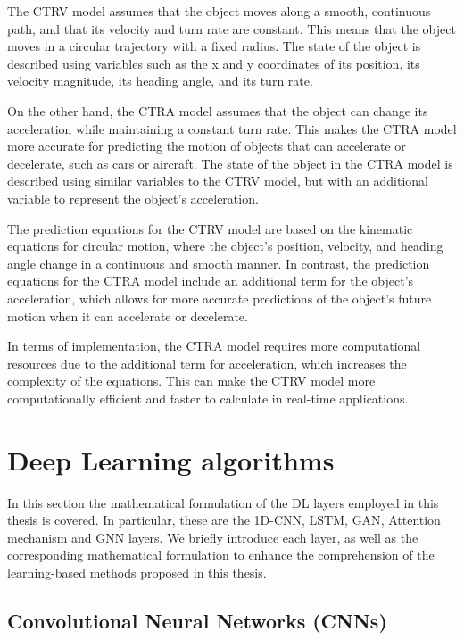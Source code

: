 The CTRV model assumes that the object moves along a smooth, continuous path, and that its velocity and turn rate are constant. This means that the object moves in a circular trajectory with a fixed radius. The state of the object is described using variables such as the x and y coordinates of its position, its velocity magnitude, its heading angle, and its turn rate.

On the other hand, the CTRA model assumes that the object can change its acceleration while maintaining a constant turn rate. This makes the CTRA model more accurate for predicting the motion of objects that can accelerate or decelerate, such as cars or aircraft. The state of the object in the CTRA model is described using similar variables to the CTRV model, but with an additional variable to represent the object's acceleration.

The prediction equations for the CTRV model are based on the kinematic equations for circular motion, where the object's position, velocity, and heading angle change in a continuous and smooth manner. In contrast, the prediction equations for the CTRA model include an additional term for the object's acceleration, which allows for more accurate predictions of the object's future motion when it can accelerate or decelerate.

In terms of implementation, the CTRA model requires more computational resources due to the additional term for acceleration, which increases the complexity of the equations. This can make the CTRV model more computationally efficient and faster to calculate in real-time applications. 

\section{Deep Learning algorithms}
\label{sec:3_dlb_formulation}

In this section the mathematical formulation of the \ac{DL} layers employed in this thesis is covered. In particular, these are the 1D-\ac{CNN}, \ac{LSTM}, \ac{GAN}, Attention mechanism and \ac{GNN} layers. We briefly introduce each layer, as well as the corresponding mathematical formulation to enhance the comprehension of the learning-based methods proposed in this thesis.

\subsection{Convolutional Neural Networks (CNNs)}
\label{subsec:3_cnns}

